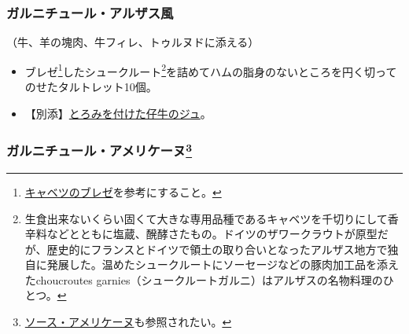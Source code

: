 \begin{recette}
\hypertarget{garniture-alsacienne}{%
\subsubsection{ガルニチュール・アルザス風}\label{garniture-alsacienne}}



（牛、羊の塊肉、牛フィレ、トゥルヌドに添える）

\begin{itemize}
\item
  ブレゼ\footnote{\protect\hyperlink{chou-braise}{キャベツのブレゼ}を参考にすること。}したシュークルート\footnote{生食出来ないくらい固くて大きな専用品種であるキャベツを千切りにして香辛料などとともに塩蔵、醗酵さたもの。ドイツのザワークラウトが原型だが、歴史的にフランスとドイツで領土の取り合いとなったアルザス地方で独自に発展した。温めたシュークルートにソーセージなどの豚肉加工品を添えたchoucroutes
    garnies（シュークルートガルニ）はアルザスの名物料理のひとつ。}を詰めてハムの脂身のないところを円く切ってのせたタルトレット10個。
\item
  【別添】\protect\hyperlink{jus-de-veau-lie}{とろみを付けた仔牛のジュ}。
\end{itemize}

\atoaki{}

\hypertarget{garniture-americaine}{%
\subsubsection[ガルニチュール・アメリケーヌ]{\texorpdfstring{ガルニチュール・アメリケーヌ\footnote{\protect\hyperlink{sauce-americaine}{ソース・アメリケーヌ}も参照されたい。}}{ガルニチュール・アメリケーヌ}}\label{garniture-americaine}}




\end{recette}

